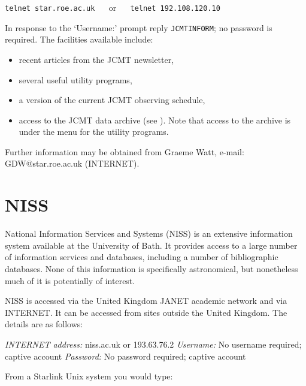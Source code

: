\documentclass[twoside,11pt,nolof]{starlink}
\begin{document}
\vspace{2.0 mm}
\verb:telnet star.roe.ac.uk: ~~ or ~~ \verb:telnet 192.108.120.10:
\vspace{2.0 mm}

In response to the `Username:' prompt reply \texttt{JCMTINFORM}; no
password is required. The facilities available include:

\begin{itemize}

  \item recent articles from the JCMT newsletter,

  \item several useful utility programs,

  \item a version of the current JCMT observing schedule,

  \item access to the JCMT data archive (see ).
   Note that access
   to the archive is under the menu for the utility programs.

\end{itemize}

Further information may be obtained from Graeme Watt, e-mail:
GDW@star.roe.ac.uk
\newline (INTERNET).


\section{NISS
\label{NISS}}

National Information Services and Systems (NISS) is an extensive
information system available at the University of Bath. It provides
access to a large number of information services and databases,
including a number of bibliographic databases. None of this information
is specifically astronomical, but nonetheless much of it is potentially
of interest.

NISS is accessed via the United Kingdom JANET academic network and via
INTERNET. It can be accessed from sites outside the United Kingdom. The
details are as follows:

\textit{INTERNET address:} niss.ac.uk or 193.63.76.2
\newline \textit{Username:} No username required; captive account
\newline \textit{Password:} No password required; captive account

From a Starlink Unix system you would type:
\end{document}

